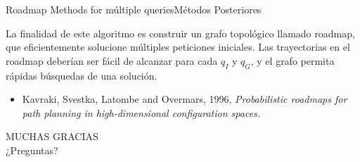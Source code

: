 \documentclass{beamer}
\begin{document}
\begin{frame}{Roadmap Methods for múltiple queries}{Métodos Posteriores}

La finalidad de este algoritmo es construir un grafo topológico llamado roadmap, que eficientemente solucione múltiples peticiones iniciales. Las trayectorias en el roadmap deberían ser fácil de alcanzar para cada $q_I$ y $q_G$, y el grafo permita rápidas búsquedas de una solución.

\begin{itemize}
	\item Kavraki, Svestka, Latombe and Overmars, 1996, \textit{Probabilistic roadmaps for path planning in high-dimensional configuration spaces.}
\end{itemize}
\end{frame}

\begin{frame}
	\centering
	\LARGE{MUCHAS GRACIAS}\\
	\pause
	\bigskip
	\bigskip
	\Large{¿Preguntas?}
\end{frame}
\end{document}
